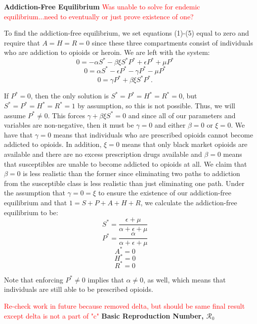 \documentclass[12pt]{article}
\begin{document}
 \textbf{Addiction-Free Equilibrium} 
\textcolor{red}{Was unable to solve for endemic equilibrium...need to eventually or just prove existence of one?}

To find the addiction-free equilibrium, we set equations (1)-(5) equal to zero and require that $A=H=R=0$ since these three compartments consist of individuals who are addiction to opioids or heroin. We are left with the system: \\
\[0=-\alpha S^* -\beta \xi S^* P^* + \epsilon P^* +\mu P^* \quad\]
\[0=\alpha S^* - \epsilon P^* -\gamma P^* - \mu P^* \quad\]
\[0=\gamma P^* + \beta \xi S^* P^*.   \quad\]



If $P^*=0$, then the only solution is $S^*=P^*=H^*=R^*=0$, but $S^*=P^*=H^*=R^*=1$ by assumption, so this is not possible. Thus, we will assume $P^* \neq 0. $ This forces $\gamma + \beta \xi S^* =0$ and since all of our parameters and variables are non-negative, then it must be $\gamma=0$ and either $\beta=0$ or $\xi=0$. We have that $\gamma=0$ means that individuals who are prescribed opioids cannot become addicted to opioids. In addition, $\xi=0$ means that only black market opioids are available and there are no excess prescription drugs available and  $\beta=0$ means that susceptibles are unable to become addicted to opioids at all. We claim that $\beta=0$ is less realistic than the former since eliminating two paths to addiction from the susceptible class is less realistic than just eliminating one path. Under the assumption that $\gamma=0=\xi$ to ensure the existence of our addiction-free equilibrium and that $1=S+P+A+H+R$, we calculate the addiction-free equilibrium to be: \\

\[S^*=\frac{\epsilon + \mu}{\alpha + \epsilon +\mu}\quad\]
\[P^*=\frac{\alpha}{\alpha + \epsilon +\mu}\quad\]
\[A^*=0\quad\]
\[H^*=0\quad\]
\[R^*=0\quad\] 

Note that enforcing $P^* \neq 0$ implies that $\alpha \neq 0$, as well, which means that individuals are still able to be prescribed opioids. 

\textcolor{red}{Re-check work in future because removed delta, but should be same final result except 
delta is not a part of "c"} \textbf{Basic Reproduction Number, \textbf{$\mathscr{R}_0$}}

\end{document}
